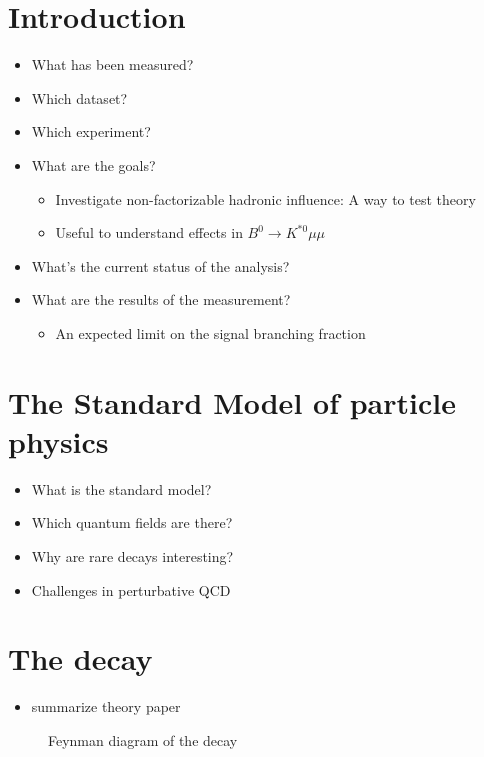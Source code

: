 
\chapter{Introduction} %

\begin{itemize}
  \item What has been measured?
  \item Which dataset?
  \item Which experiment?
  \item What are the goals? 
    \begin{itemize}
      \item Investigate non-factorizable hadronic influence: A way to test theory
      \item Useful to understand effects in $B^0\to K^{*0}\mu\mu$
    \end{itemize}
  \item What's the current status of the analysis?
  \item What are the results of the measurement?
    \begin{itemize}
      \item An expected limit on the signal branching fraction
    \end{itemize}
\end{itemize}

\chapter{The Standard Model of particle physics} %

\begin{itemize}
  \item What is the standard model?
  \item Which quantum fields are there?
  \item Why are rare decays interesting?
  \item Challenges in perturbative QCD
\end{itemize}

\chapter[The decay \bolddecay]{The decay \bolddecay} %

\begin{itemize}
  \item summarize theory paper
\end{itemize}

\begin{figure}
  \centering
  \missingfigure[figwidth=\textwidth]{}
  \caption{Feynman diagram of the decay}
\end{figure}

